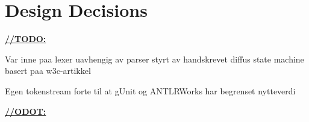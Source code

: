\section{Design Decisions}

\underline{\textbf{\LARGE //TODO:}}

Var inne paa lexer uavhengig av parser styrt av handskrevet diffus state machine basert paa w3c-artikkel

Egen tokenstream forte til at gUnit og ANTLRWorks har begrenset nytteverdi

\underline{\textbf{\LARGE //ODOT:}}